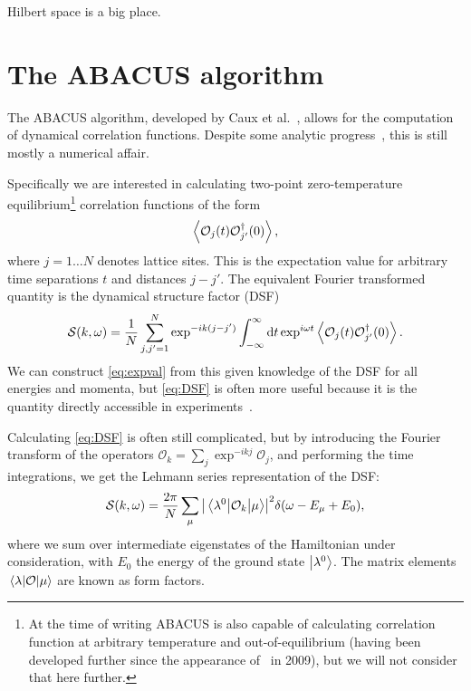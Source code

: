 \documentclass[11pt, a4paper]{report} %
\begin{document}
\begin{savequote}[50mm]
Hilbert space is a big place.
\end{savequote}


\chapter{The ABACUS algorithm}\label{chap:abacus}


\noindent
The ABACUS algorithm, developed by Caux et al.~\cite{Caux2005, Caux2007, Caux2007a, Caux2005a}, allows for the computation of dynamical correlation functions.
Despite some analytic progress~\cite{Nardis2016,Nardis2015,slavnov90_noneq_time_curren_correl_funct}, this is still mostly a numerical affair.

Specifically we are interested in calculating two-point zero-temperature equilibrium\footnote{At the time of writing ABACUS is also capable of calculating correlation function at arbitrary temperature and out-of-equilibrium (having been developed further since the appearance of~\cite{Caux2009} in 2009), but we will not consider that here further.} correlation functions of the form
\begin{equation}\label{eq:expval}
	\expval{\mathcal{O}_j(t)\mathcal{O}_{j'}^{\dagger}(0)},
\end{equation}
where \(j=1\ldots N\) denotes lattice sites.
This is the expectation value for arbitrary time separations $t$ and distances $j-j'$.
The equivalent Fourier transformed quantity is the dynamical structure factor (DSF)
\begin{equation}\label{eq:DSF}
	\mathcal{S}(k,\omega) = \frac{1}{N} \sum_{j,j'=1}^{N} \exp^{-ik(j-j')} \int_{-\infty}^{\infty}\dd t \exp^{i\omega t}\expval{\mathcal{O}_j(t)\mathcal{O}_{j'}^{\dagger}(0)}.
\end{equation}
We can construct \cref{eq:expval} from this given knowledge of the DSF for all energies and momenta, but \cref{eq:DSF} is often more useful because it is the quantity directly accessible in experiments~\cite{Caux2009,Caux2007a}.

Calculating \cref{eq:DSF} is often still complicated, but by introducing the Fourier transform of the operators $\mathcal{O}_k=\sum_j \exp^{-ikj} \mathcal{O}_j$, and performing the time integrations, we get the Lehmann series representation of the DSF:
\begin{equation}
  \label{eq:lehman}
  \mathcal{S}(k,\omega) = \frac{2\pi}{N}\sum_{\mu}\abs{\mel{\lambda^0}{\mathcal{O}_k}{\mu}}^2 \delta(\omega-E_{\mu}+E_0), 
\end{equation}
where we sum over intermediate eigenstates of the Hamiltonian under consideration, with $E_0$ the energy of the ground state $\ket{\lambda^0}$.
The matrix elements $\mel{\lambda}{\mathcal{O}}{\mu}$ are known as form factors.
\end{document}
